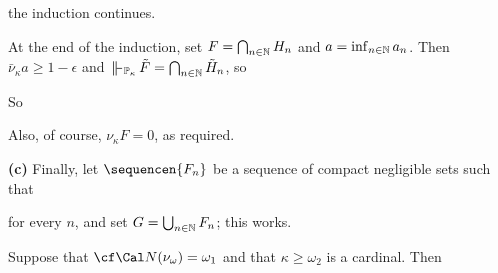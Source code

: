 {\noindent the induction continues.

At the end of the induction, set $F=\bigcap_{n\in\Bbb N}H_n$ and
$a=\inf_{n\in\Bbb N}a_n$.   Then $\bar\nu_{\kappa}a\ge 1-\epsilon$ and
$\VVdPk\,\tilde F=\bigcap_{n\in\Bbb N}\tilde H_n$, so


\noindent So


\noindent Also, of course, $\nu_{\kappa}F=0$, as required.\ \Qed

\medskip

{\bf (c)} Finally, let $\sequencen{F_n}$ be a sequence of compact negligible
sets such that


\noindent for every $n$, and set $G=\bigcup_{n\in\Bbb N}F_n$;  this works.
}%

 Suppose that $\cf\Cal N(\nu_{\omega})=\omega_1$
and that $\kappa\ge\omega_2$ is a cardinal.   Then


